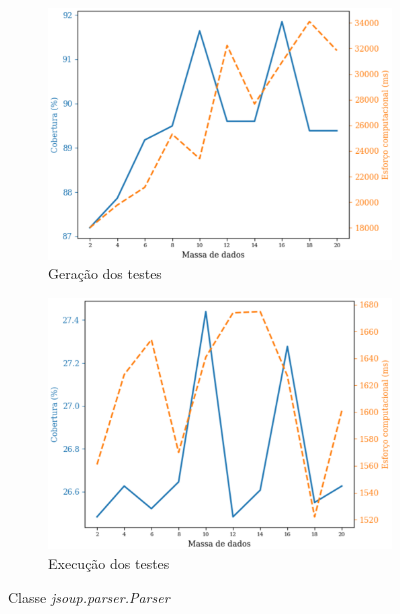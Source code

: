 \begin{figure}[H]
\centering
\begin{subfigure}{.5\textwidth}
    \centering
    \includegraphics[scale=0.5]{figuras/jsoup.parser.parser_generation.eps}
    \caption{Geração dos testes}
    \label{fig:genJsoupParser}
\end{subfigure}%
\begin{subfigure}{.5\textwidth}
    \centering
    \includegraphics[scale=0.5]{figuras/jsoup.parser.parser_execution.eps}
    \caption{Execução dos testes}
    \label{fig:execJsoupParser}
\end{subfigure}
\caption{Classe \textit{jsoup.parser.Parser}}
\label{fig:JsoupParser}
\end{figure}

